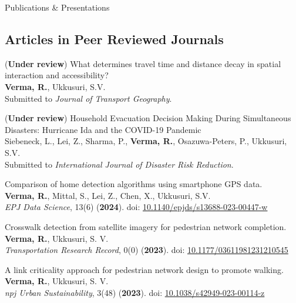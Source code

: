 \documentclass{CV} %
\begin{document}
\begin{rSection}{Publications \& Presentations}
    \subsection*{Articles in Peer Reviewed Journals}
    \begin{etaremune}
        \item (\textbf{Under review}) What determines travel time and distance decay in spatial interaction and accessibility?
        \\ \textbf{Verma, R.}, Ukkusuri, S.V.
        \\ Submitted to \textit{Journal of Transport Geography}.

        \item (\textbf{Under review}) Household Evacuation Decision Making During Simultaneous Disasters: Hurricane Ida and the COVID-19 Pandemic
        \\ Siebeneck, L., Lei, Z., Sharma, P., \textbf{Verma, R.}, Osazuwa-Peters, P., Ukkusuri, S.V.
        \\ Submitted to \textit{International Journal of Disaster Risk Reduction}.

        \item Comparison of home detection algorithms using smartphone GPS data.
        \\ \textbf{Verma, R.}, Mittal, S., Lei, Z., Chen, X., Ukkusuri, S.V.
        \\ \textit{EPJ Data Science}, 13(6) (\textbf{2024}). doi: \href{https://doi.org/10.1140/epjds/s13688-023-00447-w}{10.1140/epjds/s13688-023-00447-w}
        
        \item Crosswalk detection from satellite imagery for pedestrian network completion.
        \\ \textbf{Verma, R.}, Ukkusuri, S. V.
        \\ \textit{Transportation Research Record}, 0(0) (\textbf{2023}). doi: \href{https://doi.org/10.1177/03611981231210545}{10.1177/03611981231210545}
        
        \item A link criticality approach for pedestrian network design to promote walking.
        \\ \textbf{Verma, R.}, Ukkusuri, S. V.
        \\ \textit{npj Urban Sustainability}, 3(48) (\textbf{2023}). doi: \href{https://doi.org/10.1038/s42949-023-00114-z}{10.1038/s42949-023-00114-z}
        

\end{etaremune}
\end{rSection}
\end{document}
